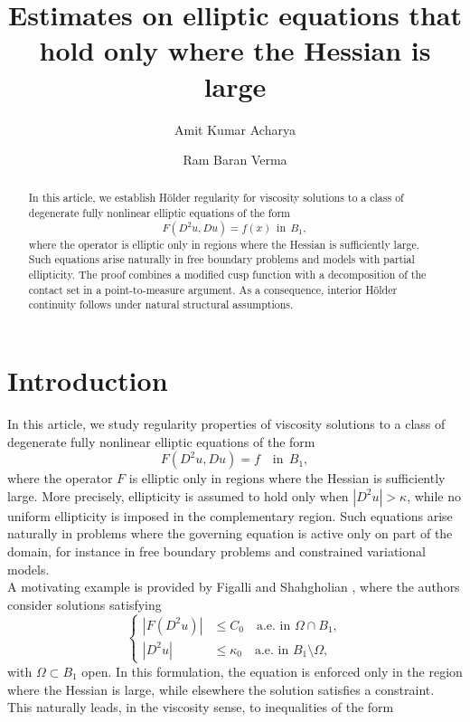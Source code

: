 \documentclass{amsart}
\title{Estimates on elliptic equations that hold only where the Hessian is large}
\author{Amit Kumar Acharya}
\author{Ram Baran Verma}
\theoremstyle{plain}
\numberwithin{equation}{section}
\begin{document}
\begin{abstract}
In this article, we establish H\"older regularity for viscosity solutions to a class of degenerate fully nonlinear elliptic equations of the form
\[
F(D^2u,Du)=f(x)~~\text{in}~~B_1,
\]
where the operator is elliptic only in regions where the Hessian is sufficiently large. Such equations arise naturally in free boundary problems and models with partial ellipticity. The proof combines a modified cusp function with a decomposition of the contact set in a point-to-measure argument. As a consequence, interior H\"older continuity follows under natural structural assumptions.
\end{abstract}
\maketitle
\section{Introduction}
In this article, we study regularity properties of viscosity solutions to a class of degenerate fully nonlinear elliptic equations of the form
\begin{equation}\label{aleso2}
F(D^{2}u,Du)=f \quad \text{in}~~ B_{1},
\end{equation}
where the operator $F$ is elliptic only in regions where the Hessian is sufficiently large. More precisely, ellipticity is assumed to hold only when $|D^{2}u|>\kappa$, while no uniform ellipticity is imposed in the complementary region. Such equations arise naturally in problems where the governing equation is active only on part of the domain, for instance in free boundary problems and constrained variational models.\\
A motivating example is provided by Figalli and Shahgholian \cite{figalli2014general}, where the authors consider solutions satisfying
\begin{equation*}\label{ales1}
\left\{
\begin{aligned}
|F(D^{2}u)|&\leq C_{0} \quad \text{a.e. in } \Omega \cap B_{1},\\
|D^{2}u|&\leq \kappa_{0} \quad \text{a.e. in } B_{1}\setminus \Omega,
\end{aligned}
\right.
\end{equation*}
with $\Omega \subset B_{1}$ open. In this formulation, the equation is enforced only in the region where the Hessian is large, while elsewhere the solution satisfies a constraint. This naturally leads, in the viscosity sense, to inequalities of the form
\end{document}

